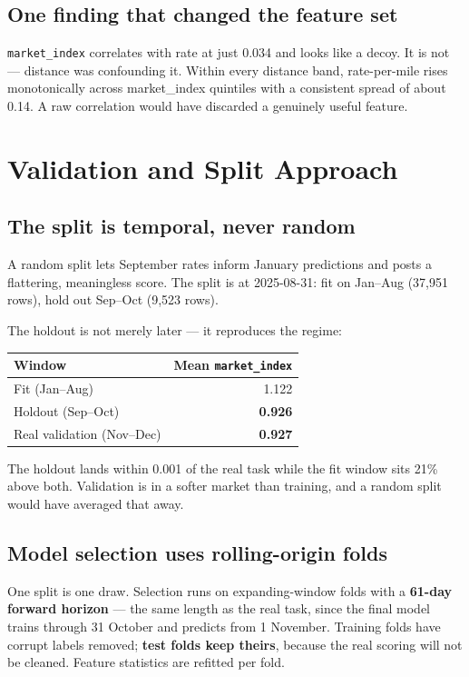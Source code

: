 \documentclass[11pt,a4paper]{article}
\newcommand{\key}[1]{\textbf{\color{spotter}#1}}
\begin{document}
\subsection{One finding that changed the feature set}

\texttt{market\_index} correlates with rate at just 0.034 and looks like a decoy.
It is not --- distance was confounding it. Within every distance band, rate-per-mile
rises monotonically across market\_index quintiles with a consistent spread of
about 0.14. A raw correlation would have discarded a genuinely useful feature.

\section{Validation and Split Approach}

\subsection{The split is temporal, never random}

A random split lets September rates inform January predictions and posts a
flattering, meaningless score. The split is at 2025-08-31: fit on Jan--Aug
(37{,}951 rows), hold out Sep--Oct (9{,}523 rows).

The holdout is not merely later --- it reproduces the regime:

\begin{center}
\small
\begin{tabular}{@{}lr@{}}
\toprule
\textbf{Window} & \textbf{Mean \texttt{market\_index}}\\
\midrule
Fit (Jan--Aug) & 1.122\\
Holdout (Sep--Oct) & \key{0.926}\\
Real validation (Nov--Dec) & \key{0.927}\\
\bottomrule
\end{tabular}
\end{center}

The holdout lands within 0.001 of the real task while the fit window sits 21\%
above both. Validation is in a softer market than training, and a random split
would have averaged that away.

\subsection{Model selection uses rolling-origin folds}

One split is one draw. Selection runs on expanding-window folds with a
\key{61-day forward horizon} --- the same length as the real task, since the final
model trains through 31 October and predicts from 1 November. Training folds have
corrupt labels removed; \key{test folds keep theirs}, because the real scoring
will not be cleaned. Feature statistics are refitted per fold.
\end{document}
